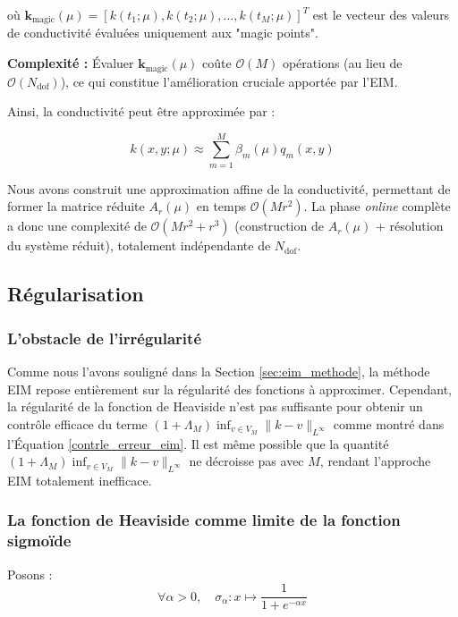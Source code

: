 \documentclass[12pt,a4paper]{article}
\begin{document}
où $\mathbf{k}_{\text{magic}}(\mu) = [k(t_1; \mu), k(t_2; \mu), \ldots, k(t_M; \mu)]^T$ est le vecteur des valeurs de conductivité évaluées uniquement aux "magic points".

\textbf{Complexité :} Évaluer $\mathbf{k}_{\text{magic}}(\mu)$ coûte $\mathcal{O}(M)$ opérations (au lieu de $\mathcal{O}(N_{\text{dof}})$), ce qui constitue l'amélioration cruciale apportée par l'EIM.

Ainsi, la conductivité peut être approximée par :

\begin{equation*}
k(x, y; \mu) \approx \sum_{m=1}^{M} \beta_m(\mu) q_m(x, y)
\end{equation*}

Nous avons construit une approximation affine de la conductivité, permettant de former la matrice réduite $A_r(\mu)$ en temps $\mathcal{O}(M r^2)$. La phase \textit{online} complète a donc une complexité de $\mathcal{O}(M r^2 + r^3)$ (construction de $A_r(\mu)$ + résolution du système réduit), totalement indépendante de $N_{\text{dof}}$.

\subsection{Régularisation} \label{sec:regularisation}

\subsubsection{L'obstacle de l'irrégularité}

Comme nous l'avons souligné dans la Section \ref{sec:eim_methode}, la méthode EIM repose entièrement sur la régularité des fonctions à approximer. Cependant, la régularité de la fonction de Heaviside n'est pas suffisante pour obtenir un contrôle efficace du terme $(1 + \Lambda_M) \inf_{v \in V_M} \| k - v \|_{L^\infty}$ comme montré dans l'Équation \eqref{contrle_erreur_eim}. Il est même possible que la quantité $(1 + \Lambda_M) \inf_{v \in V_M} \| k - v \|_{L^\infty}$ ne décroisse pas avec $M$, rendant l'approche EIM totalement inefficace.


\subsubsection{La fonction de Heaviside comme limite de la fonction sigmoïde}

Posons : 
\begin{equation*}
    \forall \alpha > 0, \quad \sigma_{\alpha} : x \mapsto \frac{1}{1 + e^{-\alpha x}}
\end{equation*}
\end{document}
